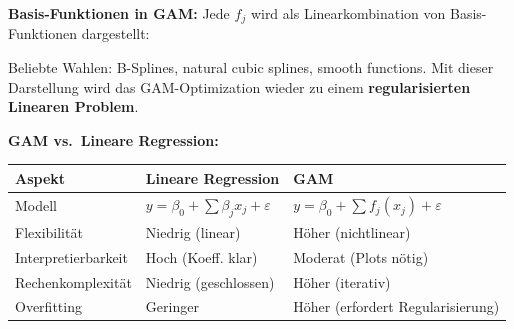 \textbf{Basis-Funktionen in GAM:} Jede $f_j$ wird als Linearkombination von Basis-Funktionen dargestellt:

Beliebte Wahlen: B-Splines, natural cubic splines, smooth functions. Mit dieser Darstellung wird das GAM-Optimization wieder zu einem \textbf{regularisierten Linearen Problem}.


\textbf{GAM vs.\ Lineare Regression:}
\begin{table}[h]
    \centering
    \small
    \begin{tabular}{|l|l|l|}
        \hline
        \textbf{Aspekt} & \textbf{Lineare Regression} & \textbf{GAM} \\
        \hline
        Modell & $y = \beta_0 + \sum \beta_j x_j + \varepsilon$ & $y = \beta_0 + \sum f_j(x_j) + \varepsilon$ \\
        \hline
        Flexibilität & Niedrig (linear) & Höher (nichtlinear) \\
        \hline
        Interpretierbarkeit & Hoch (Koeff. klar) & Moderat (Plots nötig) \\
        \hline
        Rechenkomplexität & Niedrig (geschlossen) & Höher (iterativ) \\
        \hline
        Overfitting & Geringer & Höher (erfordert Regularisierung) \\
        \hline
    \end{tabular}
\end{table}


